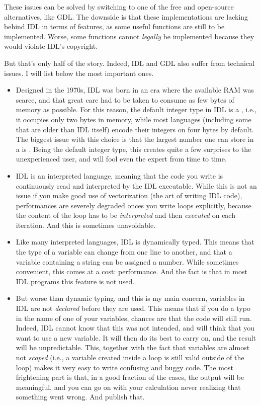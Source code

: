 \documentclass[12pt,a4paper]{report}
\begin{document}
These issues can be solved by switching to one of the free and open-source alternatives, like GDL. The downside is that these implementations are lacking behind IDL in terms of features, as some useful functions are still to be implemented. Worse, some functions cannot \emph{legally} be implemented because they would violate IDL's copyright.

But that's only half of the story. Indeed, IDL and GDL also suffer from technical issues. I will list below the most important ones.
\begin{itemize}
\item Designed in the 1970s, IDL was born in an era where the available RAM was scarce, and that great care had to be taken to consume as few bytes of memory as possible. For this reason, the default integer type in IDL is a , i.e., it occupies only two bytes in memory, while most languages (including some that are older than IDL itself) encode their integers on four bytes by default. The biggest issue with this choice is that the largest number one can store in a  is . Being the default integer type, this creates quite a few surprises to the unexperienced user, and will fool even the expert from time to time.
\item IDL is an interpreted language, meaning that the code you write is continuously read and interpreted by the IDL executable. While this is not an issue if you make good use of vectorization (the art of writing IDL code), performances are severely degraded onces you write loops explicitly, because the content of the loop has to be \emph{interpreted} and then \emph{executed} on each iteration. And this is sometimes unavoidable.
\item Like many interpreted languages, IDL is dynamically typed. This means that the type of a variable can change from one line to another, and that a variable containing a string can be assigned a number. While sometimes convenient, this comes at a cost: performance. And the fact is that in most IDL programs this feature is not used.
\item But worse than dynamic typing, and this is my main concern, variables in IDL are not \emph{declared} before they are used. This means that if you do a typo in the name of one of your variables, chances are that the code will still run. Indeed, IDL cannot know that this was not intended, and will think that you want to use a new variable. It will then do its best to carry on, and the result will be unpredictable. This, together with the fact that variables are almost not \emph{scoped} (i.e., a variable created inside a  loop is still valid outside of the loop) makes it very easy to write confusing and buggy code. The most frightening part is that, in a good fraction of the cases, the output will be meaningful, and you can go on with your calculation never realizing that something went wrong. And publish that.
\end{itemize}
\end{document}
